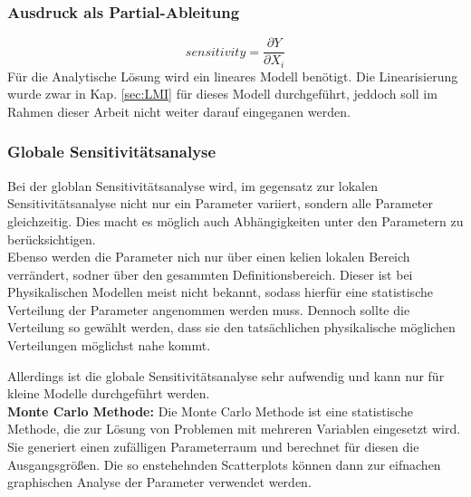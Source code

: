 \subsubsection*{Ausdruck als Partial-Ableitung}
\begin{equation}
    sensitivity=\frac{\partial Y}{\partial X_i}
\end{equation}
Für die Analytische Lösung wird ein lineares Modell benötigt. Die Linearisierung wurde zwar in Kap. \ref{sec:LMI} für dieses Modell durchgeführt, jeddoch soll im Rahmen dieser Arbeit nicht weiter darauf eingeganen werden.
\subsubsection*{Globale Sensitivitätsanalyse}
Bei der globlan Sensitivitätsanalyse wird, im gegensatz zur lokalen Sensitivitätsanalyse nicht nur ein Parameter variiert, sondern alle Parameter gleichzeitig.
Dies macht es möglich auch Abhängigkeiten unter den Parametern zu berücksichtigen. \\
Ebenso werden die Parameter nich nur über einen kelien lokalen Bereich verrändert, sodner über den gesammten Definitionsbereich.
Dieser ist bei Physikalischen Modellen meist nicht bekannt, sodass hierfür eine statistische Verteilung der Parameter angenommen werden muss.
Dennoch sollte die Verteilung so gewählt werden, dass sie den tatsächlichen physikalische möglichen Verteilungen möglichst nahe kommt.

Allerdings ist die globale Sensitivitätsanalyse sehr aufwendig und kann nur für kleine Modelle durchgeführt werden.\\

\textbf{Monte Carlo Methode:}
Die Monte Carlo Methode ist eine statistische Methode, die zur Lösung von Problemen mit mehreren Variablen eingesetzt wird.
Sie generiert einen zufälligen Parameterraum und berechnet für diesen die Ausgangsgrößen.
Die so enstehehnden Scatterplots können dann zur eifnachen graphischen Analyse der Parameter verwendet werden.


